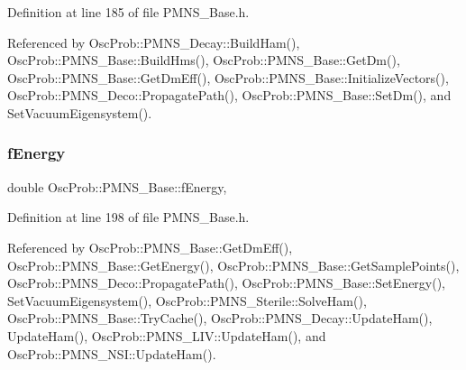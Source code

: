 Definition at line 185 of file P\+M\+N\+S\+\_\+\+Base.\+h.



Referenced by Osc\+Prob\+::\+P\+M\+N\+S\+\_\+\+Decay\+::\+Build\+Ham(), Osc\+Prob\+::\+P\+M\+N\+S\+\_\+\+Base\+::\+Build\+Hms(), Osc\+Prob\+::\+P\+M\+N\+S\+\_\+\+Base\+::\+Get\+Dm(), Osc\+Prob\+::\+P\+M\+N\+S\+\_\+\+Base\+::\+Get\+Dm\+Eff(), Osc\+Prob\+::\+P\+M\+N\+S\+\_\+\+Base\+::\+Initialize\+Vectors(), Osc\+Prob\+::\+P\+M\+N\+S\+\_\+\+Deco\+::\+Propagate\+Path(), Osc\+Prob\+::\+P\+M\+N\+S\+\_\+\+Base\+::\+Set\+Dm(), and Set\+Vacuum\+Eigensystem().

\mbox{\label{classOscProb_1_1PMNS__Base_a2800af6d436972f3e900867790c046b0}} 
\subsubsection{\texorpdfstring{f\+Energy}{fEnergy}}
{\footnotesize\ttfamily double Osc\+Prob\+::\+P\+M\+N\+S\+\_\+\+Base\+::f\+Energy\hspace{0.3cm}{\ttfamily [protected]}, {\ttfamily [inherited]}}



Definition at line 198 of file P\+M\+N\+S\+\_\+\+Base.\+h.



Referenced by Osc\+Prob\+::\+P\+M\+N\+S\+\_\+\+Base\+::\+Get\+Dm\+Eff(), Osc\+Prob\+::\+P\+M\+N\+S\+\_\+\+Base\+::\+Get\+Energy(), Osc\+Prob\+::\+P\+M\+N\+S\+\_\+\+Base\+::\+Get\+Sample\+Points(), Osc\+Prob\+::\+P\+M\+N\+S\+\_\+\+Deco\+::\+Propagate\+Path(), Osc\+Prob\+::\+P\+M\+N\+S\+\_\+\+Base\+::\+Set\+Energy(), Set\+Vacuum\+Eigensystem(), Osc\+Prob\+::\+P\+M\+N\+S\+\_\+\+Sterile\+::\+Solve\+Ham(), Osc\+Prob\+::\+P\+M\+N\+S\+\_\+\+Base\+::\+Try\+Cache(), Osc\+Prob\+::\+P\+M\+N\+S\+\_\+\+Decay\+::\+Update\+Ham(), Update\+Ham(), Osc\+Prob\+::\+P\+M\+N\+S\+\_\+\+L\+I\+V\+::\+Update\+Ham(), and Osc\+Prob\+::\+P\+M\+N\+S\+\_\+\+N\+S\+I\+::\+Update\+Ham().

\mbox{\label{classOscProb_1_1PMNS__Base_a6319c34d7decbb9d7d6da279c06e8c2d}} 
